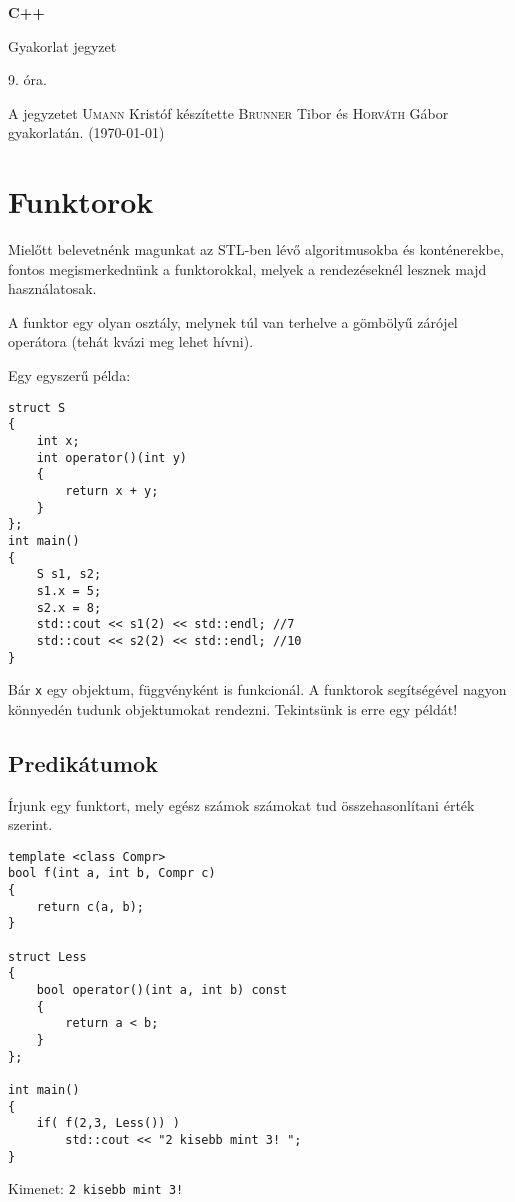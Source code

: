 \documentclass[a4paper,11.5pt,table]{article}
\begin{document}
	\setlength\parindent{0pt}
	\def\<{<\hspace{0mm}<}
	
	\theoremstyle{definition}
	\newtheorem{note}{Megjegyzés}[subsection]
	
	\begin{center}
		{\LARGE\textbf{C++}}
		
		{\Large Gyakorlat jegyzet}
		
		9. óra.
	\end{center}
	A jegyzetet \textsc{Umann} Kristóf készítette \textsc{Brunner} Tibor és \textsc{Horváth} Gábor gyakorlatán. (\today)
	
	\section{Funktorok}
	Mielőtt belevetnénk magunkat az STL-ben lévő algoritmusokba és konténerekbe, fontos megismerkednünk a funktorokkal, melyek a rendezéseknél lesznek majd használatosak.
	\medskip
	
	A funktor egy olyan osztály, melynek túl van terhelve a gömbölyű zárójel operátora (tehát kvázi meg lehet hívni).
	
	\smallskip
	Egy egyszerű példa:
	\begin{lstlisting}
struct S
{
	int x;
	int operator()(int y)
	{
		return x + y;
	}
};
int main()
{
	S s1, s2;
	s1.x = 5;
	s2.x = 8;
	std::cout << s1(2) << std::endl; //7
	std::cout << s2(2) << std::endl; //10
}
	\end{lstlisting}
	Bár \texttt{x} egy objektum, függvényként is funkcionál. A funktorok segítségével nagyon könnyedén tudunk objektumokat rendezni. Tekintsünk is erre egy példát!
	\subsection{Predikátumok}
	Írjunk egy funktort, mely egész számok számokat tud összehasonlítani érték szerint.
	\begin{lstlisting}
template <class Compr>
bool f(int a, int b, Compr c)
{
	return c(a, b);
}

struct Less
{
	bool operator()(int a, int b) const
	{
		return a < b;
	}
};

int main()
{
	if( f(2,3, Less()) )
		std::cout << "2 kisebb mint 3! ";
}
	\end{lstlisting}
	Kimenet: \texttt{2 kisebb mint 3!}
	
\end{document}

